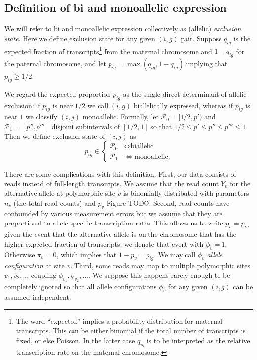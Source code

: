 \documentclass[letterpaper]{article}
\begin{document}
\subsection{Definition of bi and monoallelic expression}

We will refer to bi and monoallelic expression collectively as (allelic)
\emph{exclusion state}.  Here we define exclusion state for any given \((i,g)\) pair.
Suppose \(q_{ig}\) is the expected fraction of transcripts\footnote{The word
``expected'' implies a probability distribution for maternal transcripts.
This can be either binomial if the total number of transcripts is fixed, or
else Poisson.  In the latter case \(q_{ig}\) is to be interpreted as the
relative transcription rate on the maternal chromosome. } from the maternal
chromosome and \(1-q_{ig}\) for the paternal chromosome, and let
\(p_{ig}=\max(q_{ig},1-q_{ig})\) implying that \(p_{ig}\ge 1/2\).

We regard the expected proportion \(p_{ig}\) as the single direct determinant of
allelic exclusion: if \(p_{ig}\) is near \(1/2\) we call \((i,g)\)
biallelically expressed, whereas if \(p_{ig}\) is near \(1\) we classify
\((i,g)\) monoallelic.  Formally, let \(\mathcal{P}_0 = [1/2, p')\) and
\(\mathcal{P}_1 = [p'', p''']\) disjoint subintervals of \([1/2,1]\) so that
\(1/2\le p'\le p''\le p'''\le 1\).  Then we define exclusion state of \((i,j)\) as
\begin{equation}
p_{ig} \in
\begin{cases}
\mathcal{P}_0 & \Leftrightarrow \text{biallelic} \\
\mathcal{P}_1 & \Leftrightarrow \text{monoallelic}.
\end{cases}
\end{equation}

There are some complications with this definition.  First, our data consists of
reads instead of full-length transcripts.  We assume that the read count
\(Y_v\) for the alternative allele at polymorphic site \(v\) is binomially
distributed with parameters \(n_v\) (the total read counts) and \(p_{v}\)
Figure TODO.
Second, read counts have confounded by various measurement errors but we
assume that they are proportional to allele specific transcription rates.
This allows us to write \(p_v = p_{ig}\) given the event that the alternative
allele is on the chromosome that has the higher expected fraction of
transcripts; we denote that event with \(\phi_v=1\).  Otherwise \(\pi_v=0\),
which implies that \(1-p_v=p_{ig}\).  We may call \(\phi_v\) \emph{allele
configuration} at site \(v\).  Third, some reads may map to multiple
polymorphic sites \(v_1,v_2,...\) coupling \(\phi_{v_1},\phi_{v_2},...\).  We
suppose this happens rarely enough to be completely ignored so that all allele
configurations \(\phi_v\) for any given \((i,g)\) can be assumed independent.
\end{document}
